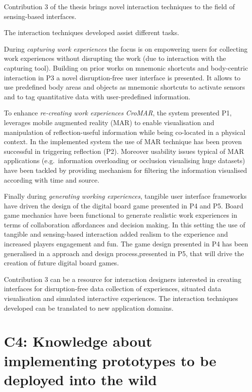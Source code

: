 Contribution 3 of the thesis brings novel interaction techniques to the field of sensing-based interfaces.

The interaction techniques developed assist different tasks.

During \emph{capturing work experiences} the focus is on empowering users for collecting work experiences without disrupting the work (due to interaction with the capturing tool). Building on prior works on mnemonic shortcuts \autocite{Guerreiro:2008wt} and body-centric interaction \autocite{Chen:2012wk} in P3 a novel disruption-free user interface is presented. It allows to use predefined body areas and objects as mnemonic shortcuts to activate sensors and to tag quantitative data with user-predefined information.

To enhance \emph{re-creating work experiences} \emph{CroMAR}, the system presented P1, leverages mobile augmented reality (MAR) to enable visualisation and manipulation of reflection-useful information while being co-located in a physical context. In the implemented system the use of MAR technique has been proven successful in triggering reflection (P2). Moreover usability issues typical of MAR applications (e.g.~information overloading or occlusion visualising huge datasets) have been tackled by providing mechanism for filtering the information visualised according with time and source.

Finally during \emph{generating working experiences}, tangible user interface frameworks have driven the design of the digital board game presented in P4 and P5. Board game mechanics have been functional to generate realistic work experiences in terms of collaboration affordances and decision making. In this setting the use of tangible and sensing-based interaction added realism to the experience and increased players engagement and fun. The game design presented in P4 has been generalised in a approach and design process,presented in P5, that will drive the creation of future digital board games.

Contribution 3 can be a resource for interaction designers interested in creating interfaces for disruption-free data collection of experiences, situated data visualisation and simulated interactive experiences. The interaction techniques developed can be translated to new application domains.

\section{C4: Knowledge about implementing prototypes to be deployed into the wild}\label{c4-knowledge-about-implementing-prototypes-to-be-deployed-into-the-wild}

